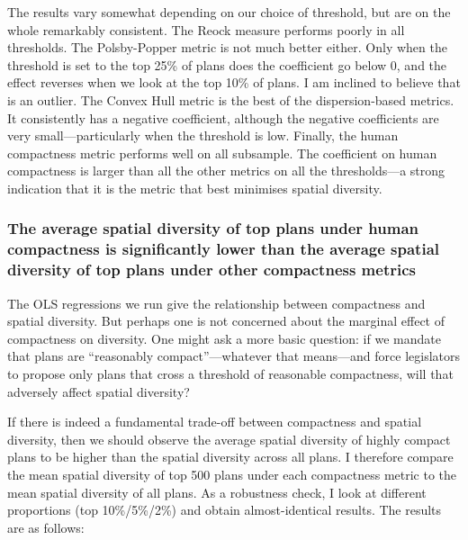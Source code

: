 \documentclass[]{article}
\begin{document}
The results vary somewhat depending on our choice of threshold, but are
on the whole remarkably consistent. The Reock measure performs poorly in
all thresholds. The Polsby-Popper metric is not much better either. Only
when the threshold is set to the top 25\% of plans does the coefficient
go below 0, and the effect reverses when we look at the top 10\% of
plans. I am inclined to believe that is an outlier. The Convex Hull
metric is the best of the dispersion-based metrics. It consistently has
a negative coefficient, although the negative coefficients are very
small---particularly when the threshold is low. Finally, the human
compactness metric performs well on all subsample. The coefficient on
human compactness is larger than all the other metrics on all the
thresholds---a strong indication that it is the metric that best
minimises spatial diversity.

\hypertarget{the-average-spatial-diversity-of-top-plans-under-human-compactness-is-significantly-lower-than-the-average-spatial-diversity-of-top-plans-under-other-compactness-metrics}{%
\subsubsection{The average spatial diversity of top plans under human
compactness is significantly lower than the average spatial diversity of
top plans under other compactness
metrics}\label{the-average-spatial-diversity-of-top-plans-under-human-compactness-is-significantly-lower-than-the-average-spatial-diversity-of-top-plans-under-other-compactness-metrics}}

The OLS regressions we run give the relationship between compactness and
spatial diversity. But perhaps one is not concerned about the marginal
effect of compactness on diversity. One might ask a more basic question:
if we mandate that plans are ``reasonably compact''---whatever that
means---and force legislators to propose only plans that cross a
threshold of reasonable compactness, will that adversely affect spatial
diversity?

If there is indeed a fundamental trade-off between compactness and
spatial diversity, then we should observe the average spatial diversity
of highly compact plans to be higher than the spatial diversity across
all plans. I therefore compare the mean spatial diversity of top 500
plans under each compactness metric to the mean spatial diversity of all
plans. As a robustness check, I look at different proportions (top
10\%/5\%/2\%) and obtain almost-identical results. The results are as
follows:
\end{document}
